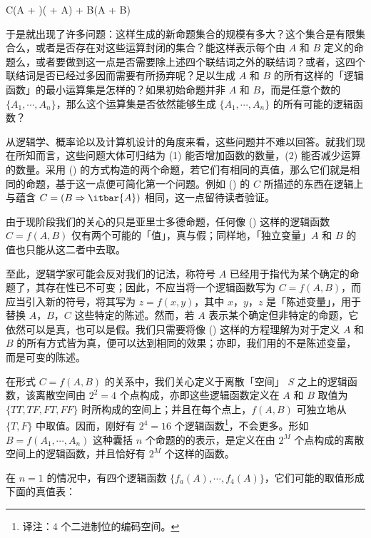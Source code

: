 \placeformula[1-15]
\startformula
C\equiv (A + )( + A) + B(A + B)
\stopformula

于是就出现了许多问题：这样生成的新命题集合的规模有多大？这个集合是有限集合么，或者是否存在对这些运算封闭的集合？能这样表示每个由 $A$ 和 $B$ 定义的命题么，或者要做到这一点是否需要除上述四个联结词之外的联结词？或者，这四个联结词是否已经过多因而需要有所扬弃呢？足以生成 $A$ 和 $B$ 的所有这样的「逻辑函数」的最小运算集是怎样的？如果初始命题并非 $A$ 和 $B$，而是任意个数的 $\{A_1,\cdots,A_n\}$，那么这个运算集是否依然能够生成 $\{A_1,\cdots,A_n\}$ 的所有可能的逻辑函数？

从逻辑学、概率论以及计算机设计的角度来看，这些问题并不难以回答。就我们现在所知而言，这些问题大体可归结为 (1) 能否增加函数的数量，(2) 能否减少运算的数量。采用 (\in[1-15]) 的方式构造的两个命题，若它们有相同的真值，那么它们就是相同的命题，基于这一点便可简化第一个问题。例如 (\in[1-15]) 的 $C$ 所描述的东西在逻辑上与蕴含 $C = (B\Rightarrow \itbar{A})$ 相同，这一点留待读者验证。

由于现阶段我们的关心的只是亚里士多德命题，任何像 (\in[1-15]) 这样的逻辑函数 $C = f(A, B)$ 仅有两个可能的「值」，真与假；同样地，「独立变量」$A$ 和 $B$ 的值也只能从这二者中去取。

至此，逻辑学家可能会反对我们的记法，称符号 $A$ 已经用于指代为某个确定的命题了，其存在性已不可变；因此，不应当将一个逻辑函数写为 $C = f(A, B)$，而应当引入新的符号，将其写为 $z = f(x, y)$，其中 $x$，$y$，$z$ 是「陈述变量」，用于替换 $A$，$B$，$C$ 这些特定的陈述。然而，若 $A$ 表示某个确定但非特定的命题，它依然可以是真，也可以是假。我们只需要将像 (\in[1-15]) 这样的方程理解为对于定义 $A$ 和 $B$ 的所有方式皆为真，便可以达到相同的效果；亦即，我们用的不是陈述变量，而是可变的陈述。

在形式 $C = f(A, B)$ 的关系中，我们关心定义于离散「空间」 $S$ 之上的逻辑函数，该离散空间由 $2^2 = 4$ 个点构成，亦即这些逻辑函数定义在 $A$ 和 $B$ 取值为 $\{TT, TF, FT, FF\}$ 时所构成的空间上；并且在每个点上，$f(A, B)$ 可独立地从 $\{T,F\}$ 中取值。因而，刚好有 $2^4 = 16$ 个逻辑函数\footnote{译注：4 个二进制位的编码空间。}，不会更多。形如 $B = f(A_1, \cdots, A_n)$ 这种囊括 $n$ 个命题的的表示，是定义在由 $2^M$ 个点构成的离散空间上的逻辑函数，并且恰好有 $2^M$ 个这样的函数。

在 $n = 1$ 的情况中，有四个逻辑函数 $\{f_a(A),\cdots,f_4(A)\}$，它们可能的取值形成下面的真值表：

